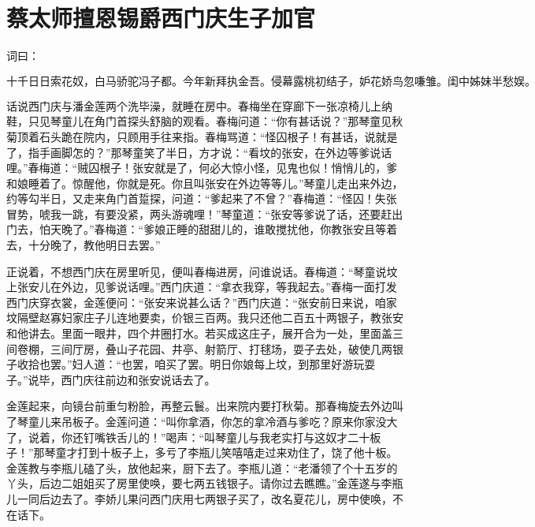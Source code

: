 

\chapter{蔡太师擅恩锡爵\KG 西门庆生子加官}


词曰：

\[
十千日日索花奴，白马骄驼冯子都。今年新拜执金吾。侵幕露桃初结子，妒花娇鸟忽嗛雏。闺中姊妹半愁娱。
\]

话说西门庆与潘金莲两个洗毕澡，就睡在房中。春梅坐在穿廊下一张凉椅儿上纳鞋，只见琴童儿在角门首探头舒脑的观看。春梅问道：“你有甚话说？”那琴童见秋菊顶着石头跪在院内，只顾用手往来指。春梅骂道：“怪囚根子！有甚话，说就是了，指手画脚怎的？”那琴童笑了半日，方才说：“看坟的张安，在外边等爹说话哩。”春梅道：“贼囚根子！张安就是了，何必大惊小怪，见鬼也似！悄悄儿的，爹和娘睡着了。惊醒他，你就是死。你且叫张安在外边等等儿。”琴童儿走出来外边，约等勾半日，又走来角门首踅探，问道：“爹起来了不曾？”春梅道：“怪囚！失张冒势，唬我一跳，有要没紧，两头游魂哩！”琴童道：“张安等爹说了话，还要赶出门去，怕天晚了。”春梅道：“爹娘正睡的甜甜儿的，谁敢搅扰他，你教张安且等着去，十分晚了，教他明日去罢。”

正说着，不想西门庆在房里听见，便叫春梅进房，问谁说话。春梅道：“琴童说坟上张安儿在外边，见爹说话哩。”西门庆道：“拿衣我穿，等我起去。”春梅一面打发西门庆穿衣裳，金莲便问：“张安来说甚么话？”西门庆道：“张安前日来说，咱家坟隔壁赵寡妇家庄子儿连地要卖，价银三百两。我只还他二百五十两银子，教张安和他讲去。里面一眼井，四个井圈打水。若买成这庄子，展开合为一处，里面盖三间卷棚，三间厅房，叠山子花园、井亭、射箭厅、打毬场，耍子去处，破使几两银子收拾也罢。”妇人道：“也罢，咱买了罢。明日你娘每上坟，到那里好游玩耍子。”说毕，西门庆往前边和张安说话去了。

金莲起来，向镜台前重匀粉脸，再整云鬟。出来院内要打秋菊。那春梅旋去外边叫了琴童儿来吊板子。金莲问道：“叫你拿酒，你怎的拿冷酒与爹吃？原来你家没大了，说着，你还钉嘴铁舌儿的！”喝声：“叫琴童儿与我老实打与这奴才二十板子！”那琴童才打到十板子上，多亏了李瓶儿笑嘻嘻走过来劝住了，饶了他十板。金莲教与李瓶儿磕了头，放他起来，厨下去了。李瓶儿道：“老潘领了个十五岁的丫头，后边二姐姐买了房里使唤，要七两五钱银子。请你过去瞧瞧。”金莲遂与李瓶儿一同后边去了。李娇儿果问西门庆用七两银子买了，改名夏花儿，房中使唤，不在话下。

